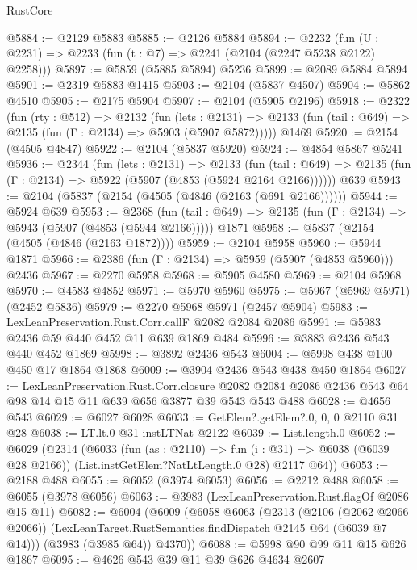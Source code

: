 \begin{lexlean}{RustCore}
\begin{coremodule}
@5884 := @2129 @5883
@5885 := @2126 @5884
@5894 := @2232 (fun (U : @2231) => @2233 (fun (t : @7) => @2241 (@2104 (@2247 @5238 @2122) @2258)))
@5897 := @5859 (@5885 @5894) @5236
@5899 := @2089 @5884 @5894
@5901 := @2319 @5883 @1415
@5903 := @2104 (@5837 @4507)
@5904 := @5862 @4510
@5905 := @2175 @5904
@5907 := @2104 (@5905 @2196)
@5918 := @2322
    (fun (rty : @512) =>
    @2132
      (fun (lets : @2131) =>
      @2133 (fun (tail : @649) => @2135 (fun (Γ : @2134) => @5903 (@5907 @5872)))))
    @1469
@5920 := @2154 (@4505 @4847)
@5922 := @2104 (@5837 @5920)
@5924 := @4854 @5867 @5241
@5936 := @2344
    (fun (lets : @2131) =>
    @2133
      (fun (tail : @649) => @2135 (fun (Γ : @2134) => @5922 (@5907 (@4853 (@5924 @2164 @2166))))))
    @639
@5943 := @2104 (@5837 (@2154 (@4505 (@4846 (@2163 (@691 @2166))))))
@5944 := @5924 @639
@5953 := @2368
    (fun (tail : @649) => @2135 (fun (Γ : @2134) => @5943 (@5907 (@4853 (@5944 @2166)))))
    @1871
@5958 := @5837 (@2154 (@4505 (@4846 (@2163 @1872))))
@5959 := @2104 @5958
@5960 := @5944 @1871
@5966 := @2386 (fun (Γ : @2134) => @5959 (@5907 (@4853 @5960))) @2436
@5967 := @2270 @5958
@5968 := @5905 @4580
@5969 := @2104 @5968
@5970 := @4583 @4852
@5971 := @5970 @5960
@5975 := @5967 (@5969 @5971) (@2452 @5836)
@5979 := @2270 @5968 @5971 (@2457 @5904)
@5983 := LexLeanPreservation.Rust.Corr.callF @2082 @2084 @2086
@5991 := @5983 @2436 @59 @440 @452 @11 @639 @1869 @484
@5996 := @3883 @2436 @543 @440 @452 @1869
@5998 := @3892 @2436 @543
@6004 := @5998 @438 @100 @450 @17 @1864 @1868
@6009 := @3904 @2436 @543 @438 @450 @1864
@6027 := LexLeanPreservation.Rust.Corr.closure
    @2082
    @2084
    @2086
    @2436
    @543
    @64
    @98
    @14
    @15
    @11
    @639
    @656
    @3877
    @39
    @543
    @543
    @488
@6028 := @4656 @543
@6029 := @6027 @6028
@6033 := GetElem?.getElem?.{0, 0, 0} @2110 @31 @28
@6038 := LT.lt.{0} @31 instLTNat @2122
@6039 := List.length.{0}
@6052 := @6029
    (@2314
      (@6033
        (fun (as : @2110) => fun (i : @31) => @6038 (@6039 @28 @2166))
        (List.instGetElem?NatLtLength.{0} @28)
        @2117
        @64))
@6053 := @2188 @488
@6055 := @6052 (@3974 @6053)
@6056 := @2212 @488
@6058 := @6055 (@3978 @6056)
@6063 := @3983 (LexLeanPreservation.Rust.flagOf @2086 @15 @11)
@6082 := @6004
    (@6009
      (@6058
        @6063
        (@2313
          (@2106 (@2062 @2066 @2066))
          (LexLeanTarget.RustSemantics.findDispatch @2145 @64 (@6039 @7 @14)))
        (@3983 (@3985 @64))
        @4370))
@6088 := @5998 @90 @99 @11 @15 @626 @1867
@6095 := @4626 @543 @39 @11 @39 @626 @4634 @2607

\end{coremodule}
\end{lexlean}
